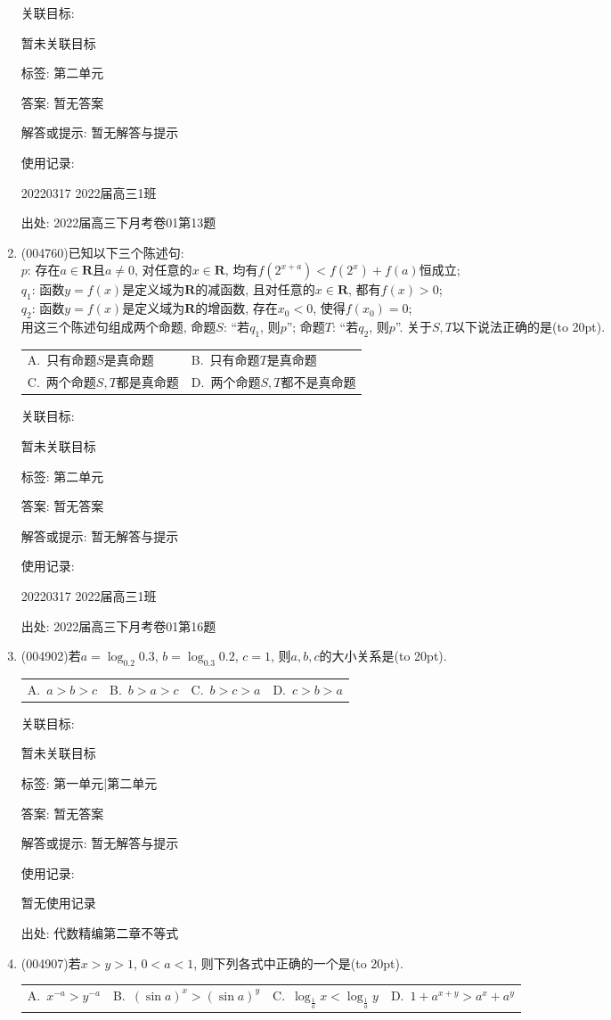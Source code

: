 \documentclass[10pt,a4paper]{article}
\newcommand{\bracket}[1]{(\hbox to #1pt{})}
\newcommand{\twoch}[4]{\par\begin{tabular}{p{.46\textwidth}p{.46\textwidth}}
A.~#1& B.~#2\\
C.~#3& D.~#4
\end{tabular}}
\newcommand{\fourch}[4]{\par\begin{tabular}{p{.23\textwidth}p{.23\textwidth}p{.23\textwidth}p{.23\textwidth}}
A.~#1 &B.~#2& C.~#3& D.~#4
\end{tabular}}
\begin{document}
\begin{enumerate}[1.]
关联目标:

暂未关联目标



标签: 第二单元

答案: 暂无答案

解答或提示: 暂无解答与提示

使用记录:

20220317	2022届高三1班	


出处: 2022届高三下月考卷01第13题
\item { (004760)}已知以下三个陈述句:\\
$p$: 存在$a\in \mathbf{R}$且$a\ne 0$, 对任意的$x\in \mathbf{R}$, 均有$f(2^{x+a})<f(2^x)+f(a)$恒成立;\\
$q_1$: 函数$y=f(x)$是定义域为$\mathbf{R}$的减函数, 且对任意的$x\in \mathbf{R}$, 都有$f(x)>0$;\\
$q_2$: 函数$y=f(x)$是定义域为$\mathbf{R}$的增函数, 存在$x_0<0$, 使得$f(x_0)=0$;\\
用这三个陈述句组成两个命题, 命题$S$: ``若$q_1$, 则$p$''; 命题$T$: ``若$q_2$, 则$p$''. 关于$S,T$以下说法正确的是\bracket{20}.
\twoch{只有命题$S$是真命题}{只有命题$T$是真命题}{两个命题$S,T$都是真命题}{两个命题$S,T$都不是真命题}


关联目标:

暂未关联目标



标签: 第二单元

答案: 暂无答案

解答或提示: 暂无解答与提示

使用记录:

20220317	2022届高三1班	


出处: 2022届高三下月考卷01第16题
\item { (004902)}若$a=\log_{0.2}0.3$, $b=\log_{0.3}0.2$, $c=1$, 则$a,b,c$的大小关系是\bracket{20}.
\fourch{$a>b>c$}{$b>a>c$}{$b>c>a$}{$c>b>a$}


关联目标:

暂未关联目标



标签: 第一单元|第二单元

答案: 暂无答案

解答或提示: 暂无解答与提示

使用记录:

暂无使用记录


出处: 代数精编第二章不等式
\item { (004907)}若$x>y>1$, $0<a<1$, 则下列各式中正确的一个是\bracket{20}.
\fourch{${x^{-a}}>{y^{-a}}$}{$(\sin a)^x>(\sin a)^y$}{$\log_{\frac 1a}x<\log_{\frac 1a}y$}{$1+a^{x+y}>a^x+a^y$}



\end{enumerate}
\end{document}
